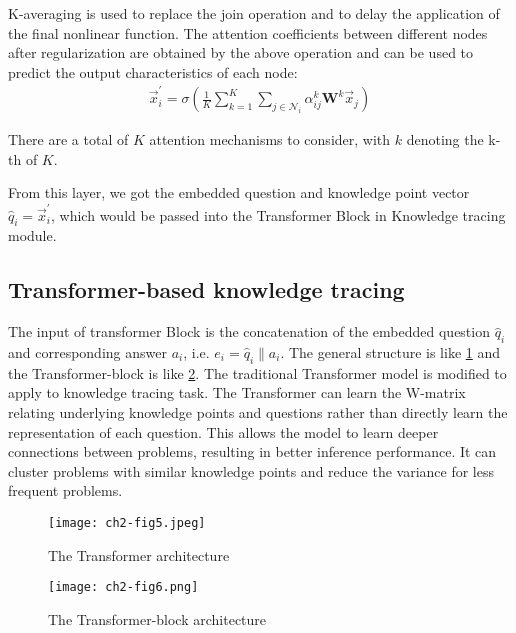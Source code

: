 K-averaging is used to replace the join operation and to delay the application of the final nonlinear function. The attention coefficients between different nodes after regularization are obtained by the above operation and can be used to predict the output characteristics of each node:
\begin{align}
	\vec{x}_{i}^{\prime}=\sigma(\frac{1}{K} \sum_{k=1}^{K} \sum_{j \in \mathcal{N}_{i}} \alpha_{i j}^{k} \mathbf{W}^{k} \vec{x}_{j})
\end{align}

There are a total of \(K\) attention mechanisms to consider, with \(k\) denoting the k-th of \(K\).


From this layer, we got the embedded question and knowledge point vector \(\hat{q}_{i} =  \vec{x}_{i}^{\prime}\), which would be passed into the Transformer Block in Knowledge tracing module.

\subsection{Transformer-based knowledge tracing}

The input of transformer Block is the concatenation of the embedded question \(\hat{q}_{i}\) and corresponding answer \(a_i\), i.e. \(e_i=\hat{q}_{i}\|a_i\). The general structure is like \figurename{\ref{fig:ch3-fig5}} and the Transformer-block is like \figurename{\ref{fig:ch3-fig6}}. The traditional Transformer model is modified to apply to knowledge tracing task. The Transformer can learn the W-matrix relating underlying knowledge points and questions rather than directly learn the representation of each question. This allows the model to learn deeper connections between problems, resulting in better inference performance. It can cluster problems with similar knowledge points and reduce the variance for less frequent problems.
\begin{figure}[h]
	\centering
	\texttt{[image: ch2-fig5.jpeg]}
	\caption{The Transformer architecture}
	\label{fig:ch3-fig5}
\end{figure}

\begin{figure}[h]
	\centering
	\texttt{[image: ch2-fig6.png]}
	\caption{The Transformer-block architecture}
	\label{fig:ch3-fig6}
\end{figure}

